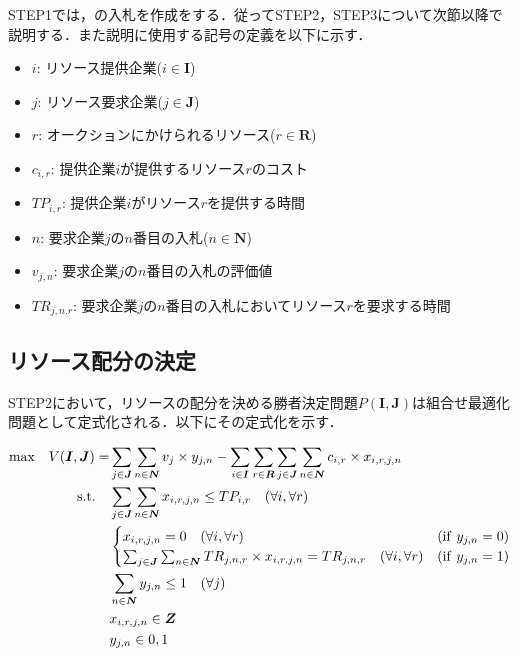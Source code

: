 STEP1では，の入札を作成をする．従ってSTEP2，STEP3について次節以降で説明する．また説明に使用する記号の定義を以下に示す．

\begin{itemize}
\tightlist
\item
  \(i\): リソース提供企業(\(i \in \boldsymbol{I}\))
\item
  \(j\): リソース要求企業(\(j \in \boldsymbol{J}\))
\item
  \(r\): オークションにかけられるリソース(\(r \in \boldsymbol{R}\))
\item
  \(c_{i,r}\): 提供企業\(i\)が提供するリソース\(r\)のコスト
\item
  \(TP_{i,r}\): 提供企業\(i\)がリソース\(r\)を提供する時間
\item
  \(n\): 要求企業\(j\)の\(n\)番目の入札(\(n \in \boldsymbol{N}\))
\item
  \(v_{j,n}\): 要求企業\(j\)の\(n\)番目の入札の評価値
\item
  \(TR_{j,n.r}\):
  要求企業\(j\)の\(n\)番目の入札においてリソース\(r\)を要求する時間
\end{itemize}

\hypertarget{ux30eaux30bdux30fcux30b9ux914dux5206ux306eux6c7aux5b9a}{%
\subsection{\texorpdfstring{リソース配分の決定
\label{method1-resorce}}{リソース配分の決定 }}\label{ux30eaux30bdux30fcux30b9ux914dux5206ux306eux6c7aux5b9a}}

STEP2において，リソースの配分を決める勝者決定問題\(P(\boldsymbol{I},\boldsymbol{J})\)は組合せ最適化問題として定式化される．以下にその定式化を示す．

\begin{align}
  {\rm max}\quad  V(\boldsymbol{I},\boldsymbol{J})=&\sum_{j\in \boldsymbol{J}}\sum_{n\in\boldsymbol{N}}v_{j} \times y_{j,n} - \sum_{i\in\boldsymbol{I}}\sum_{r\in\boldsymbol{R}}\sum_{j\in\boldsymbol{J}}\sum_{n\in\boldsymbol{N}}c_{i,r} \times x_{i,r,j,n} \label{pij-obj}\\
    {\rm s.t.} \quad &\sum_{j\in \boldsymbol{J}}\sum_{n\in\boldsymbol{N}}x_{i,r,j,n} \leq TP_{i,r} \quad (\forall i, \forall r) \label{pij-subto-cap}\\
  &\begin{cases}
    x_{i,r,j,n} = 0 \quad (\forall i, \forall r)&({\rm if} \ y_{j,n}=0) \\
    \sum_{j \in \boldsymbol{J}}\sum_{n\in\boldsymbol{N}} TR_{j,n,r} \times x_{i,r,j,n} = TR_{j,n,r}
    \quad  (\forall i, \forall r)&({\rm if} \ y_{j,n}=1) 
  \end{cases}\label{pij-subto-bundle}\\
    &\sum_{n\in \boldsymbol{N}}y_{j,n}  \leq 1 \quad (\forall j) \label{pij-subto-1winner}\\
    &x_{i,r,j,n} \in \boldsymbol{Z}\label{pij-decision-x}\\
    &y_{j,n} \in {0,1} \label{pij-decision-y}
\end{align}

